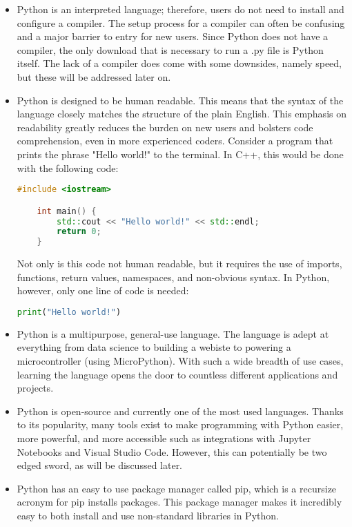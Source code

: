 \begin{itemize}
    \item Python is an interpreted language; therefore, users do not need to install and configure
    a compiler. The setup process for a compiler can often be confusing and a major barrier to entry
    for new users. Since Python does not have a compiler, the only download that is necessary to run 
    a .py file is Python itself. The lack of a compiler does come with some downsides, namely speed,
    but these will be addressed later on.
    \item Python is designed to be human readable. This means that the syntax of the language closely
    matches the structure of the plain English. This emphasis on readability greatly reduces the
    burden on new users and bolsters code comprehension, even in more experienced coders. Consider 
    a program that prints the phrase "Hello world!"  to the terminal. In C++, this would be done with 
    the following code:

    \begin{lstlisting}[language=C++]
    #include <iostream>

    int main() {
        std::cout << "Hello world!" << std::endl;
        return 0;
    }
    \end{lstlisting}

    Not only is this code not human readable, but it requires the use of imports, functions, return
    values, namespaces, and non-obvious syntax. In Python, however, only one line of code is needed:

    \begin{lstlisting}[language=Python]
    print("Hello world!")
    \end{lstlisting}
    \item Python is a multipurpose, general-use language. The language is adept at everything from
    data science to building a webiste to powering a microcontroller (using MicroPython). With such 
    a wide breadth of use cases, learning the language opens the door to countless different applications 
    and projects.
    \item Python is open-source and currently one of the most used languages. Thanks to its popularity,
    many tools exist to make programming with Python easier, more powerful, and more accessible such
    as integrations with Jupyter Notebooks and Visual Studio Code. However, this can potentially be 
    two edged sword, as will be discussed later.
    \item Python has an easy to use package manager called pip, which is a recursize acronym for pip
    installs packages. This package manager makes it incredibly easy to both install and use non-standard
    libraries in Python.
\end{itemize}

